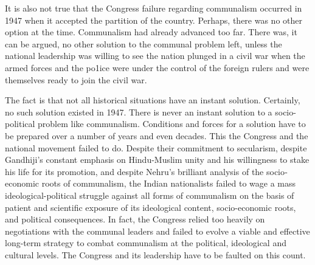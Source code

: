 It is also not true that the Congress failure regarding communalism occurred in 1947 when it accepted the partition of the country. Perhaps, there was no other option at the time. Communalism had already advanced too far. There was, it can be argued, no other solution to the communal problem left, unless the national leadership was willing to see the nation plunged in a civil war when the armed forces and the po1ice were under the control of the foreign rulers and were themselves ready to join the civil war. 

The fact is that not all historical situations have an instant solution. Certainly, no such solution existed in 1947. There is never an instant solution to a socio-political problem like communalism. Conditions and forces for a solution have to be prepared over a number of years and even decades. This the Congress and the national movement failed to do. Despite their commitment to secularism, despite Gandhiji's constant emphasis on Hindu-Muslim unity and his willingness to stake his life for its promotion, and despite Nehru's brilliant analysis of the socio­ economic roots of communalism, the Indian nationalists failed to wage a mass ideological-political struggle against all forms of communalism on the basis of patient and scientific exposure of its ideological content, socio-economic roots, and political consequences. In fact, the Congress relied too heavily on negotiations with the communal leaders and failed to evolve a viable and effective long-term strategy to combat communalism at the political, ideological and cultural levels. The Congress and its leadership have to be faulted on this count.
